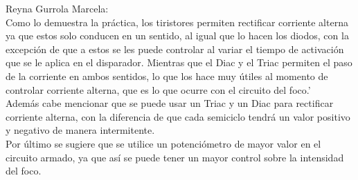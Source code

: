 \documentclass[letterpaper]{article}
\begin{document}
Reyna Gurrola Marcela: 
\\Como lo demuestra la práctica, los tiristores permiten rectificar corriente alterna ya que estos solo conducen en un sentido, al igual que lo hacen los diodos, con la excepción de que a estos se les puede controlar al variar el tiempo de activación que se le aplica en el disparador. Mientras que el Diac y el Triac permiten el paso de la corriente en ambos sentidos, lo que los hace muy útiles al momento de controlar corriente alterna, que es lo que ocurre con el circuito del foco.'\\
Además cabe mencionar que se puede usar un Triac y un Diac para rectificar corriente alterna, con la diferencia de que cada semiciclo tendrá un valor positivo y negativo de manera intermitente.\\
Por último se sugiere que se utilice un potenciómetro de mayor valor en el circuito armado, ya que así se puede tener un mayor control sobre la intensidad del foco.
\end{document}
